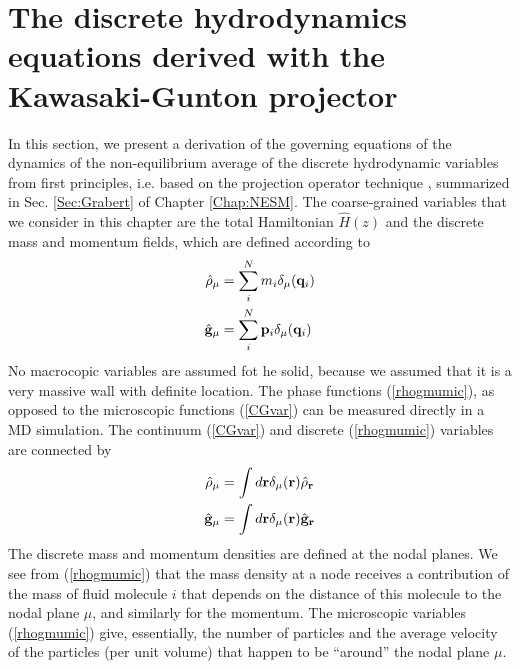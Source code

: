 \documentclass[b5paper,openright,11pt]{book}
\begin{document}
\section{The  discrete hydrodynamics equations derived
with the Kawasaki-Gunton projector}
\label{Sec:derivation}
In this section, we present a derivation of the governing equations of
the  dynamics   of  the   non-equilibrium  average  of   the  discrete
hydrodynamic  variables  from first  principles,  i.e.   based on  the
projection operator  technique \cite{Grabert1982}, summarized  in Sec.
\ref{Sec:Grabert} of Chapter \ref{Chap:NESM}.   The coarse-grained variables that we
consider in this chapter are the  total Hamiltonian $\hat{H}(z)$
and the discrete mass and momentum fields, which are defined according to
\begin{align}
\hat{\rho}_\mu&= \sum_i^Nm_i\delta_\mu({\bf q}_i)
\nonumber\\
\hat{\bf g}_\mu&= \sum_i^N{\bf p}_i\delta_\mu({\bf q}_i)
\label{rhogmumic}
\end{align}
No macrocopic variables are assumed fot he solid, because we assumed that it is a very massive wall with definite location.
The  phase  functions (\ref{rhogmumic}),  as  opposed  to  the  microscopic  functions
(\ref{CGvar}) can be  measured directly in a  MD simulation. The
continuum (\ref{CGvar}) and discrete (\ref{rhogmumic}) variables
are connected by
\begin{align}
\hat{\rho}_\mu&= \int d{\bf r}\delta_\mu({\bf r})\hat{\rho}_{\bf r}
\nonumber\\
\hat{\bf g}_\mu&=\int d{\bf r}\delta_\mu({\bf r})\hat{\bf g}_{\bf r}
\label{rhogmumiccont}
\end{align}
The  discrete mass  and momentum  densities are  defined at  the nodal
planes. We see from (\ref{rhogmumic}) that  the mass density at a node
receives a contribution of the mass of fluid molecule $i$ that depends
on  the distance  of  this  molecule to  the  nodal  plane $\mu$,  and
similarly    for   the    momentum.     The   microscopic    variables
(\ref{rhogmumic}) give,  essentially, the number of  particles and the
average velocity of the particles (per  unit volume) that happen to be
``around'' the nodal plane $\mu$.
\end{document}
